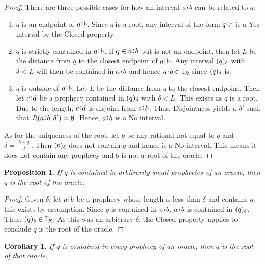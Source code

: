 \documentclass[12pt]{article}
\newtheorem{corollary}{Corollary}[section]
\newtheorem{proposition}{Proposition}[section]
\begin{document}
\begin{proof}
    There are three possible cases for how an interval $a\rint b$ can be related to $q$: 

    \begin{enumerate}
        \item $q$ is an endpoint of $a\rint b$. Since $q$ is a root, any interval of the form $q\rint r$ is a Yes interval by the Closed property.
        \item $q$ is strictly contained in $a\rint b$. If $q \in a\rint b$ but is not an endpoint, then let $L$ be the distance from $q$ to the closest endpoint of $a\rint b$. Any interval $(q)_{\delta}$ with $\delta < L $ will then be contained in $a\rint b$ and hence $a\rint b \in \mathbb{I}_R$ since $(q)_{\delta}$ is. 
        \item $q$ is outside of $a\rint b$.  Let $L$ be the distance from $q$ to the closest endpoint. Then let $c\rint d$ be a prophecy contained in $(q)_{\delta}$ with $\delta < L$. This exists as $q$ is a root. Due to the length, $c\rint d$ is disjoint from $a\rint b$. Thus, Disjointness yields a $\delta'$ such that $R(a\rint b, \delta')= \emptyset$. Hence, $a\rint b$ is a No interval. 
    \end{enumerate}
    
    As for the uniqueness of the root, let $b$ be any rational not equal to $q$ and $\delta = \frac{|b-q|}{2}$. Then $(b)_{\delta}$ does not contain $q$ and hence is a No interval. This means it does not contain any prophecy and $b$ is not a root of the oracle. 
\end{proof}


\begin{proposition}\label{os-rootsmallpro}
    If $q$ is contained in arbitrarily small prophecies of an oracle, then $q$ is the root of the oracle. 
\end{proposition}

\begin{proof}
    Given $\delta$, let $a\rint b$ be a prophecy whose length is less than $\delta$ and contains $q$; this exists by assumption. Since $q$ is contained in $a\rint b$, $a\rint b$ is contained in $(q)_{\delta}$. Thus, $(q)_{\delta} \in \mathbb{I}_R$. As this was an arbitrary $\delta$, the Closed property applies to conclude  $q$ is the root of the oracle. 
\end{proof}

\begin{corollary}\label{os-root}
    If $q$ is contained in every prophecy of an oracle, then $q$ is the root of that oracle. 
\end{corollary}
\end{document}
